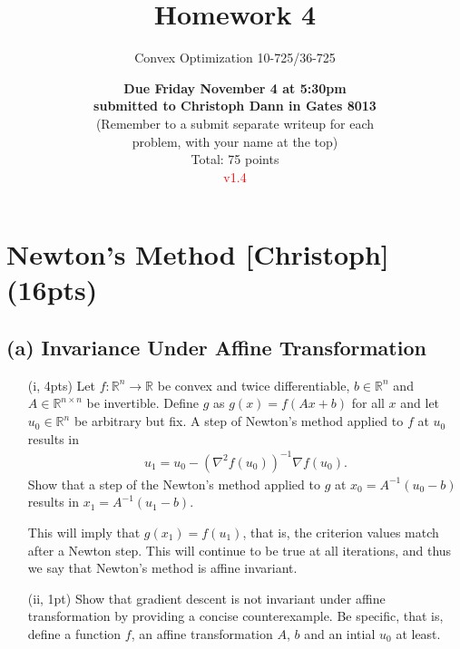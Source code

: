 \documentclass{article}
\theoremstyle{remark}
\theoremstyle{definition}
\newcommand{\reals}{\mathbb R}
\begin{document}

\title{Homework 4}

\author{\Large Convex Optimization 10-725/36-725}
\date{{\bf Due Friday November 4 at 5:30pm \\
submitted to Christoph Dann in Gates 8013} \\
(Remember to a submit separate writeup for each \\ 
problem, with your name at the top)\\
\bigskip Total: 75 points\\
\textcolor{red}{v1.4}}

\maketitle

\section{Newton's Method [Christoph] (16pts)}

\subsection*{(a) Invariance Under Affine Transformation}
\begin{itemize}
    \item[(i, 4pts)]
Let $f:\reals^n \rightarrow \reals$ be convex and twice differentiable, $b \in \reals^n$ and $A \in \reals^{n \times n}$ be invertible. Define $g$ as $g(x) = f(Ax+b)$ for all $x$ and let $u_0 \in \reals^n$ be arbitrary but fix. A step of Newton's method applied to $f$ at $u_0$ results in
\begin{align}
    u_1 = u_0 - \left( \nabla^2 f(u_0)\right)^{-1} \nabla f(u_0).
\end{align} 
Show that a step of the Newton's method applied to $g$ at $x_0 = A^{-1} (u_0 - b)$ results in $x_1 = A^{-1} (u_1 - b)$.

This will imply that $g(x_1)=f(u_1)$, that is, the criterion values
match after a Newton step.  This will continue to be true at all iterations,
and thus we say that Newton's method is affine invariant.
\item[(ii, 1pt)]
Show that gradient descent is not invariant under affine
transformation by providing a concise counterexample. Be specific, that is, define a function $f$, an affine transformation $A$, $b$ and an intial $u_0$ at least. 
\end{itemize}
\end{document}
